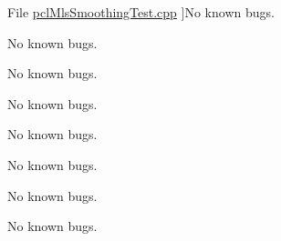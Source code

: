 \begin{DoxyRefList}
\hypertarget{bug__bug000021}{}%
File \hyperlink{pclMlsSmoothingTest_8cpp}{pcl\+Mls\+Smoothing\+Test.cpp} ]No known bugs.  
\item[\label{bug__bug000012}%
\hypertarget{bug__bug000012}{}%
Class \hyperlink{classpclPassThrough}{pcl\+Pass\+Through} ]No known bugs.  
\item[\label{bug__bug000022}%
\hypertarget{bug__bug000022}{}%
File \hyperlink{pclPassThroughTest_8cpp}{pcl\+Pass\+Through\+Test.cpp} ]No known bugs.  
\item[\label{bug__bug000023}%
\hypertarget{bug__bug000023}{}%
File \hyperlink{pclStatisticalOutlierRemovalTest_8cpp}{pcl\+Statistical\+Outlier\+Removal\+Test.cpp} ]No known bugs.  
\item[\label{bug__bug000014}%
\hypertarget{bug__bug000014}{}%
Class \hyperlink{classpclStatistOutRev}{pcl\+Statist\+Out\+Rev} ]No known bugs.  
\item[\label{bug__bug000016}%
\hypertarget{bug__bug000016}{}%
Class \hyperlink{classpclVoxel}{pcl\+Voxel} ]No known bugs.  
\item[\label{bug__bug000015}%
\hypertarget{bug__bug000015}{}%
File \hyperlink{pclVoxel_8h}{pcl\+Voxel.h} ]No known bugs.  
\item[\label{bug__bug000024}%
\hypertarget{bug__bug000024}{}%
File \hyperlink{pclVoxelTest_8cpp}{pcl\+Voxel\+Test.cpp} ]No known bugs. 
\end{DoxyRefList}